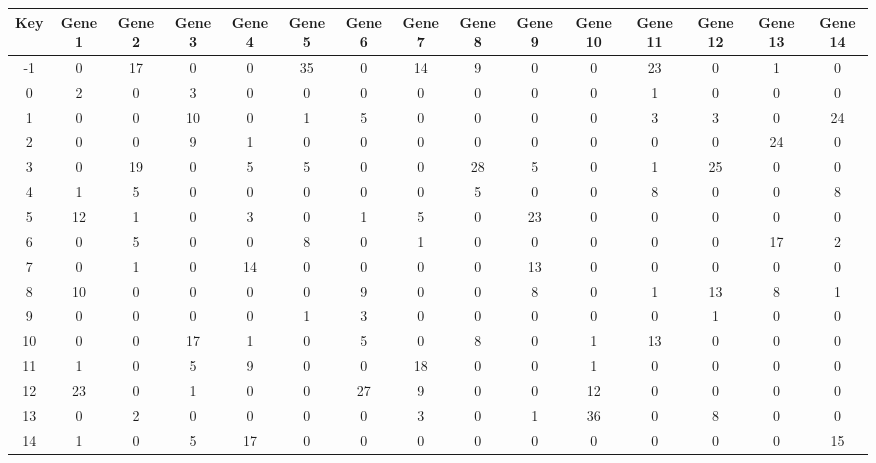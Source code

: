 \begin{tabular}{|c|c|c|c|c|c|c|c|c|c|c|c|c|c|c|}
\hline
Key & Gene 1 & Gene 2 & Gene 3 & Gene 4 & Gene 5 & Gene 6 & Gene 7 & Gene 8 & Gene 9 & Gene 10 & Gene 11 & Gene 12 & Gene 13 & Gene 14 \\
\hline
-1 & 0 & 17 & 0 & 0 & 35 & 0 & 14 & 9 & 0 & 0 & 23 & 0 & 1 & 0 \\
0 & 2 & 0 & 3 & 0 & 0 & 0 & 0 & 0 & 0 & 0 & 1 & 0 & 0 & 0 \\
1 & 0 & 0 & 10 & 0 & 1 & 5 & 0 & 0 & 0 & 0 & 3 & 3 & 0 & 24 \\
2 & 0 & 0 & 9 & 1 & 0 & 0 & 0 & 0 & 0 & 0 & 0 & 0 & 24 & 0 \\
3 & 0 & 19 & 0 & 5 & 5 & 0 & 0 & 28 & 5 & 0 & 1 & 25 & 0 & 0 \\
4 & 1 & 5 & 0 & 0 & 0 & 0 & 0 & 5 & 0 & 0 & 8 & 0 & 0 & 8 \\
5 & 12 & 1 & 0 & 3 & 0 & 1 & 5 & 0 & 23 & 0 & 0 & 0 & 0 & 0 \\
6 & 0 & 5 & 0 & 0 & 8 & 0 & 1 & 0 & 0 & 0 & 0 & 0 & 17 & 2 \\
7 & 0 & 1 & 0 & 14 & 0 & 0 & 0 & 0 & 13 & 0 & 0 & 0 & 0 & 0 \\
8 & 10 & 0 & 0 & 0 & 0 & 9 & 0 & 0 & 8 & 0 & 1 & 13 & 8 & 1 \\
9 & 0 & 0 & 0 & 0 & 1 & 3 & 0 & 0 & 0 & 0 & 0 & 1 & 0 & 0 \\
10 & 0 & 0 & 17 & 1 & 0 & 5 & 0 & 8 & 0 & 1 & 13 & 0 & 0 & 0 \\
11 & 1 & 0 & 5 & 9 & 0 & 0 & 18 & 0 & 0 & 1 & 0 & 0 & 0 & 0 \\
12 & 23 & 0 & 1 & 0 & 0 & 27 & 9 & 0 & 0 & 12 & 0 & 0 & 0 & 0 \\
13 & 0 & 2 & 0 & 0 & 0 & 0 & 3 & 0 & 1 & 36 & 0 & 8 & 0 & 0 \\
14 & 1 & 0 & 5 & 17 & 0 & 0 & 0 & 0 & 0 & 0 & 0 & 0 & 0 & 15 \\
\hline
\end{tabular}